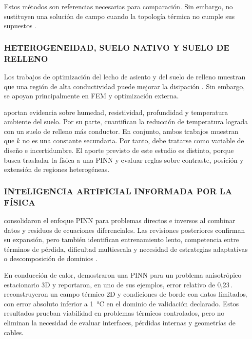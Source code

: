 Estos métodos son referencias necesarias para comparación. Sin embargo, no sustituyen una solución de campo cuando la topología térmica no cumple sus supuestos \parencites{iec60287}{iec60853}[3--4,93--99]{cigre2025}.

\subsubsection{HETEROGENEIDAD, SUELO NATIVO Y SUELO DE RELLENO}

Los trabajos de optimización del lecho de asiento y del suelo de relleno muestran que una región de alta conductividad puede mejorar la disipación \parencites[1--3]{oclon2015}[1--4]{atoccsa2024}. Sin embargo, se apoyan principalmente en FEM y optimización externa.

\textcite[1,6--9]{khumalo2025} aportan evidencia sobre humedad, resistividad, profundidad y temperatura ambiente del suelo. Por su parte, \textcite[1,10,16]{kim2025} cuantifican la reducción de temperatura lograda con un suelo de relleno más conductor. En conjunto, ambos trabajos muestran que $k$ no es una constante secundaria. Por tanto, debe tratarse como variable de diseño e incertidumbre. El aporte previsto de este estudio es distinto, porque busca trasladar la física a una PINN y evaluar reglas sobre contraste, posición y extensión de regiones heterogéneas.

\subsubsection{INTELIGENCIA ARTIFICIAL INFORMADA POR LA FÍSICA}

\textcite[686--690]{raissi2019} consolidaron el enfoque PINN para problemas directos e inversos al combinar datos y residuos de ecuaciones diferenciales. Las revisiones posteriores confirman su expansión, pero también identifican entrenamiento lento, competencia entre términos de pérdida, dificultad multiescala y necesidad de estrategias adaptativas o descomposición de dominios \parencites[1--2,14--17]{lawal2022}[2--6]{ren2025}.

En conducción de calor, \textcite[1,3,17]{xing2023} demostraron una PINN para un problema anisotrópico estacionario 3D y reportaron, en uno de sus ejemplos, error relativo de 0,23\,\pct. \textcite[1,3,16]{pan2025} reconstruyeron un campo térmico 2D y condiciones de borde con datos limitados, con error absoluto inferior a \SI{1}{\celsius} en el dominio de validación declarado. Estos resultados prueban viabilidad en problemas térmicos controlados, pero no eliminan la necesidad de evaluar interfaces, pérdidas internas y geometrías de cables.

